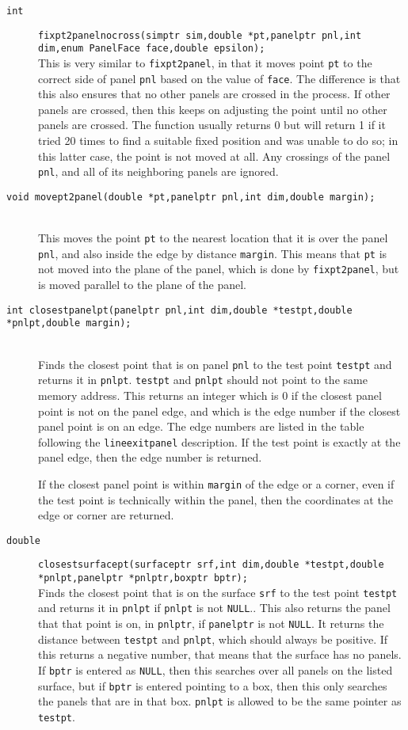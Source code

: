 \documentclass {scrbook}
\newcommand {\ttt} {\texttt}
\begin{document}
\begin{description}
\item[\ttt{int}]
\ttt{fixpt2panelnocross(simptr sim,double *pt,panelptr pnl,int dim,enum PanelFace face,double epsilon);}
\hfill \\
This is very similar to \ttt{fixpt2panel}, in that it moves point \ttt{pt} to the correct side of panel \ttt{pnl} based on the value of \ttt{face}. The difference is that this also ensures that no other panels are crossed in the process. If other panels are crossed, then this keeps on adjusting the point until no other panels are crossed. The function usually returns 0 but will return 1 if it tried 20 times to find a suitable fixed position and was unable to do so; in this latter case, the point is not moved at all. Any crossings of the panel \ttt{pnl}, and all of its neighboring panels are ignored.

\item[\ttt{void movept2panel(double *pt,panelptr pnl,int dim,double margin);}]
\hfill \\
This moves the point \ttt{pt} to the nearest location that it is over the panel \ttt{pnl}, and also inside the edge by distance \ttt{margin}. This means that \ttt{pt} is not moved into the plane of the panel, which is done by \ttt{fixpt2panel}, but is moved parallel to the plane of the panel.

\item[\ttt{int closestpanelpt(panelptr pnl,int dim,double *testpt,double *pnlpt,double margin);}]
\hfill \\
Finds the closest point that is on panel \ttt{pnl} to the test point \ttt{testpt} and returns it in \ttt{pnlpt}. \ttt{testpt} and \ttt{pnlpt} should not point to the same memory address. This returns an integer which is 0 if the closest panel point is not on the panel edge, and which is the edge number if the closest panel point is on an edge. The edge numbers are listed in the table following the \ttt{lineexitpanel} description. If the test point is exactly at the panel edge, then the edge number is returned.

If the closest panel point is within \ttt{margin} of the edge or a corner, even if the test point is technically within the panel, then the coordinates at the edge or corner are returned.

\item[\ttt{double}]
\ttt{closestsurfacept(surfaceptr srf,int dim,double *testpt,double *pnlpt,panelptr *pnlptr,boxptr bptr);}
\hfill \\
Finds the closest point that is on the surface \ttt{srf} to the test point \ttt{testpt} and returns it in \ttt{pnlpt} if \ttt{pnlpt} is not \ttt{NULL}.. This also returns the panel that that point is on, in \ttt{pnlptr}, if \ttt{panelptr} is not \ttt{NULL}. It returns the distance between \ttt{testpt} and \ttt{pnlpt}, which should always be positive. If this returns a negative number, that means that the surface has no panels. If \ttt{bptr} is entered as \ttt{NULL}, then this searches over all panels on the listed surface, but if \ttt{bptr} is entered pointing to a box, then this only searches the panels that are in that box. \ttt{pnlpt} is allowed to be the same pointer as \ttt{testpt}.


\end{description}
\end{document}
